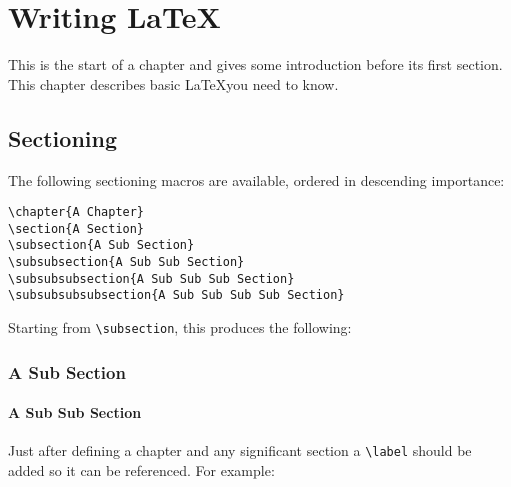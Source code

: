 
\chapter{Writing \LaTeX}

This is the start of a chapter and gives some introduction before its first section.  This chapter describes basic \LaTeX you need to know.

\section{Sectioning}

The following sectioning macros are available, ordered in descending
importance:

\begin{verbatim}
\chapter{A Chapter}
\section{A Section}
\subsection{A Sub Section}
\subsubsection{A Sub Sub Section}
\subsubsubsection{A Sub Sub Sub Section}
\subsubsubsubsection{A Sub Sub Sub Sub Section}
\end{verbatim}

Starting from \verb|\subsection|, this produces the following:

\subsection{A Sub Section}
\subsubsection{A Sub Sub Section}

Just after defining a chapter and any significant section a
\verb|\label| should be added so it can be referenced.  For example:

